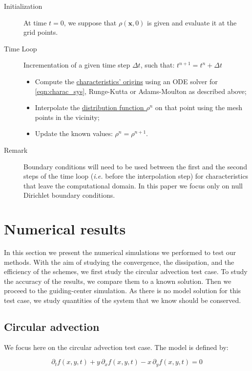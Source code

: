 \documentclass[proc]{edpsmath}
\begin{document}
\begin{description}
	\item[Initialization] At time $t=0$, we suppose that $\rho(\mathbf{x}, 0)$ is given and evaluate it at the grid points.
	\item[Time Loop] Incrementation of a given time step $\Delta t$, such that: $t^{n+1} = t^n + \Delta t$
		\begin{itemize}
		\item Compute the \underline{characteristics' origins} using an ODE solver for \eqref{eqn:charac_sys}, Runge-Kutta or Adams-Moulton as described above;
		\item Interpolate the \underline{distribution function $\rho^n$} on that point using the mesh points in the vicinity;
		\item Update the known values: $\rho^n = \rho^{n+1}$.
		\end{itemize}
	\item[Remark] Boundary conditions will need to be used between the first and the second steps of the time loop (\emph{i.e.} before the interpolation step) for characteristics that leave the computational domain. In this paper we focus only on null Dirichlet boundary conditions.
\end{description}



 
\section{Numerical results}
\label{sec:results}
In this section we present the  numerical simulations we performed to test our methods. With the aim of studying the convergence, the dissipation, and the  efficiency of the schemes, we first study the circular advection test case. To study the accuracy of the results, we compare them to a known solution. Then we proceed to the guiding-center simulation. As there is no model solution for this test case, we study quantities of the system that we know should be conserved.


\subsection{Circular advection}

We focus here on the circular advection test case. The model is defined by:

	\begin{equation}
		\partial_t f(x,y,t) + y\,\partial_x f(x,y,t) - x \,\partial_y f(x,y,t) = 0 
	\end{equation}
\end{document}
